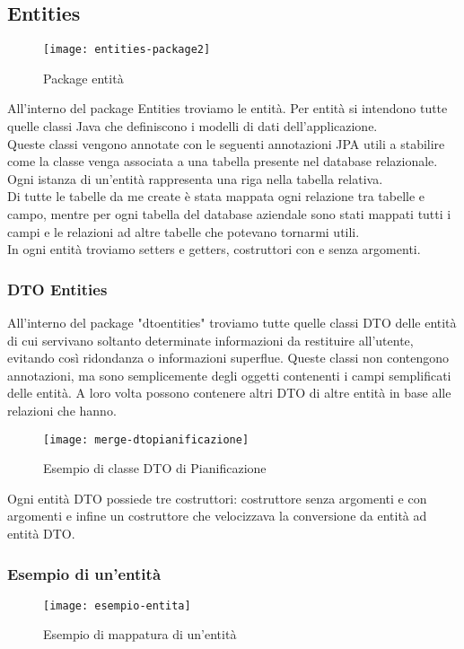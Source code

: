 \subsection{Entities}

\begin{figure}[H] 
    \centering 
    \texttt{[image: entities-package2]} 
    \caption{Package entità}
\end{figure}

\noindent All'interno del package Entities troviamo le entità. Per entità si intendono tutte quelle classi Java che definiscono i modelli di dati dell'applicazione.\\
Queste classi vengono annotate con le seguenti annotazioni JPA utili a stabilire come la classe venga associata a una tabella presente nel database relazionale. Ogni istanza di un'entità rappresenta una riga nella tabella relativa.\\
Di tutte le tabelle da me create è stata mappata ogni relazione tra tabelle e campo, mentre per ogni tabella del database aziendale sono stati mappati tutti i campi e le relazioni ad altre tabelle che potevano tornarmi utili.\\
In ogni entità troviamo setters e getters, costruttori con e senza argomenti.\\
\subsubsection{DTO Entities}
All'interno del package "dtoentities" troviamo tutte quelle classi DTO delle entità di cui servivano soltanto determinate informazioni da restituire all'utente, evitando così ridondanza o informazioni superflue. Queste classi non contengono annotazioni, ma sono semplicemente degli oggetti contenenti i campi semplificati delle entità. A loro volta possono contenere altri DTO di altre entità in base alle relazioni che hanno.
\begin{figure}[H] 
    \centering 
    \texttt{[image: merge-dtopianificazione]} 
    \caption{Esempio di classe DTO di Pianificazione}
\end{figure}
\noindent Ogni entità DTO possiede tre costruttori: costruttore senza argomenti e con argomenti e infine un costruttore che velocizzava la conversione da entità ad entità DTO.

\subsubsection{Esempio di un'entità}
\begin{figure}[H] 
    \centering 
    \texttt{[image: esempio-entita]} 
    \caption{Esempio di mappatura di un'entità}
\end{figure}

